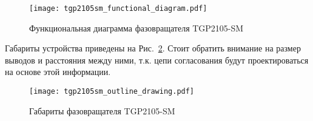 \begin{figure}[!ht]
    \centering
    \texttt{[image: tgp2105sm\_functional\_diagram.pdf]}
    \caption{Функциональная диаграмма фазовращателя TGP2105-SM}%
    \label{fig:tgp2105sm_functional_diagram}
\end{figure}

Габариты устройства приведены на Рис.~\ref{fig:tgp2105sm_outline_drawing}.
Стоит обратить внимание на размер выводов и расстояния между ними, т.к. цепи согласования будут проектироваться на основе этой информации.

\begin{figure}[!ht]
    \centering
    \texttt{[image: tgp2105sm\_outline\_drawing.pdf]}
    \caption{Габариты фазовращателя TGP2105-SM}%
    \label{fig:tgp2105sm_outline_drawing}
\end{figure}
